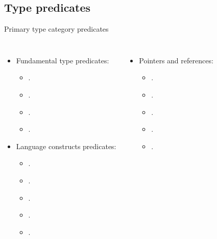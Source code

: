 \subsection{Type predicates}

\begin{frame}[t,fragile]{Primary type category predicates}
\begin{columns}[T]

\begin{itemize}
  \item Fundamental type predicates:
    \begin{itemize}
      \item {}.
      \item {}.
      \item {}.
      \item {}.
    \end{itemize}

  \item Language constructs predicates:
    \begin{itemize}
      \item {}.
      \item {}.
      \item {}.
      \item {}.
      \item {}.
    \end{itemize}
\end{itemize}

\begin{itemize}
  \pause
  \item Pointers and references:
    \begin{itemize}
      \item {}.
      \item {}.
      \item {}.
      \item {}.
      \item {}.
    \end{itemize}
\end{itemize}
\end{columns}
\end{frame}

